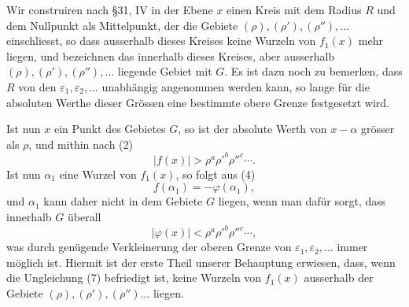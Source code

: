 \documentclass[11pt]{article}
\begin{document}
Wir construiren nach \S 31, IV in der Ebene $x$ einen Kreis mit dem Radius $R$ und dem Nullpunkt als Mittelpunkt, der die Gebiete $(\rho),(\rho'),(\rho''),\ldots$ einschliesst, so dass ausserhalb dieses Kreises keine Wurzeln von $f_1(x)$ mehr liegen, und bezeichnen das innerhalb dieses Kreises, aber ausserhalb $(\rho),(\rho'),(\rho''),\ldots$ liegende Gebiet mit $G$. Es ist dazu noch zu bemerken, dass $R$ von den $\varepsilon_1,\varepsilon_2,
\ldots$ unabhängig angenommen werden kann, so lange für die absoluten Werthe dieser Grössen eine bestimmte obere Grenze festgesetzt wird.

\begin{center}
\end{center}

Ist nun $x$ ein Punkt des Gebietes $G$, so ist der absolute Werth von $x-\alpha$ grösser als $\rho$, und mithin nach (2)
\begin{equation}
 |f(x)|>\rho^a\rho'^b\rho''^c\cdots .
\tag{5}
\end{equation}
Ist nun $\alpha_1$ eine Wurzel von $f_1(x)$, so folgt aus (4)
\begin{equation}
 f(\alpha_1)=-\varphi(\alpha_1),
\tag{6}
\end{equation}
und $\alpha_1$ kann daher nicht in dem Gebiete $G$ liegen, wenn man dafür sorgt, dass innerhalb $G$ überall
\begin{equation}
 |\varphi(x)|<\rho^a\rho'^b\rho''^c\cdots,
\tag{7}
\end{equation}
was durch genügende Verkleinerung der oberen Grenze von $\varepsilon_1,\varepsilon_2,
\ldots$ immer möglich ist. Hiermit ist der erste Theil unserer Behauptung erwiesen, dass, wenn die Ungleichung (7) befriedigt ist, keine Wurzeln von $f_1(x)$ ausserhalb der Gebiete $(\rho),(\rho'),(\rho'')\ldots$ liegen.
\end{document}
